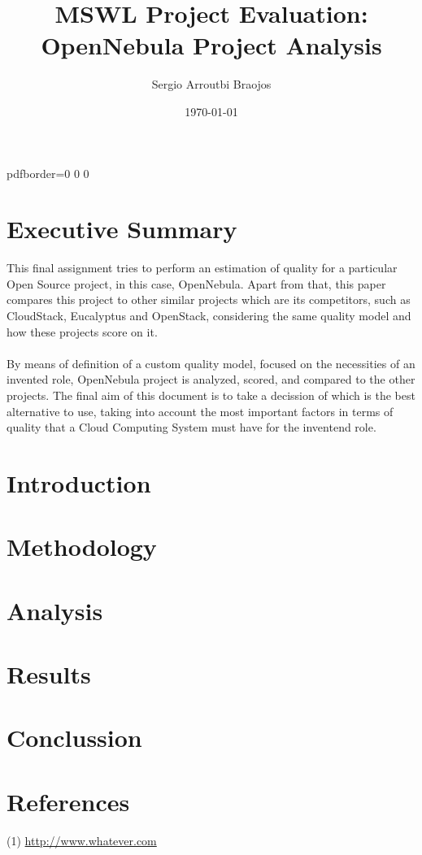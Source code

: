\documentclass[11pt]{article}
\title{\textbf{MSWL Project Evaluation: OpenNebula Project Analysis}}
\author{Sergio Arroutbi Braojos}
\date{\today}
\begin{document}
\hypersetup
{   
pdfborder={0 0 0}
}
   
\maketitle

\tableofcontents

\pagebreak

\section{Executive Summary}
This final assignment tries to perform an estimation of quality for a particular Open Source project, in this case, OpenNebula. Apart from that, this paper compares this project to other similar projects which are its competitors, such as CloudStack, Eucalyptus and OpenStack, considering the same quality model and how these projects score on it.\\
\\
By means of definition of a custom quality model, focused on the necessities of an invented role, OpenNebula project is analyzed, scored, and compared to the other projects. The final aim of this document is to take a decission of which is the best alternative to use, taking into account the most important factors in terms of quality that a Cloud Computing System must have for the inventend role.

\section{Introduction}

\section{Methodology}

\section{Analysis}

\section{Results}

\section{Conclussion}

\section{References}
(1) \url{http://www.whatever.com}
\end{document}
